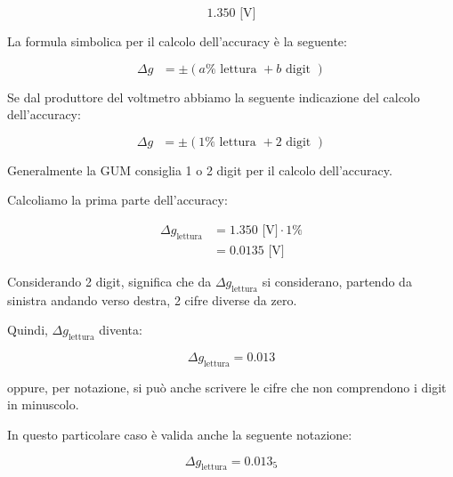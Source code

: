 {
    \Large 
    \begin{equation}
        1.350 \text{ [V]}
    \end{equation}
}

La formula simbolica per il calcolo dell'accuracy è la seguente: 

{
    \Large 
    \begin{equation}
        \Delta g \text{ } = \pm (a \% \text{ lettura }+ b \text{ digit }) 
    \end{equation}
}

Se dal produttore del voltmetro abbiamo la seguente indicazione del calcolo dell'accuracy: 

{
    \Large 
    \begin{equation}
        \Delta g \text{ } = \pm (1 \% \text{ lettura }+ 2 \text{ digit }) 
    \end{equation}
}

Generalmente la GUM consiglia 1 o 2 digit per il calcolo dell'accuracy. \newline 


Calcoliamo la prima parte dell'accuracy: 

{
    \Large 
    \begin{equation}
        \begin{split}
            \Delta g_{\text{lettura}}
            &= 
            1.350 \text{ [V]} 
            \cdot 1 \% 
            \\ 
            &= 
            0.0135 \text{ [V]}
        \end{split}
    \end{equation}
}

Considerando 2 digit, significa che da $\Delta g_{\text{lettura}}$ si considerano, 
partendo da sinistra andando verso destra, 2 cifre diverse da zero. \newline 

Quindi, $\Delta g_{\text{lettura}}$ diventa: 

{
    \Large 
    \begin{equation}
        \Delta g_{\text{lettura}} = 0.013
    \end{equation}
}

oppure, per notazione, si può anche scrivere le cifre che non comprendono i digit in minuscolo. \newline 

In questo particolare caso è valida anche la seguente notazione: 

{
    \Large 
    \begin{equation}
        \Delta g_{\text{lettura}} = 0.013_{5}
    \end{equation}
}

